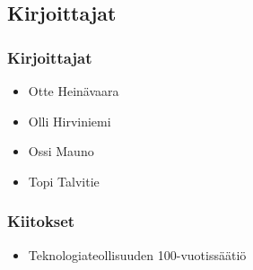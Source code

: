 \subsection*{Kirjoittajat}

\subsubsection*{Kirjoittajat}

\begin{itemize}
 \item Otte Heinävaara
 \item Olli Hirviniemi
 \item Ossi Mauno
 \item Topi Talvitie
\end{itemize}

\subsubsection*{Kiitokset}

\begin{itemize}
 \item Teknologiateollisuuden 100-vuotissäätiö
\end{itemize}
 
